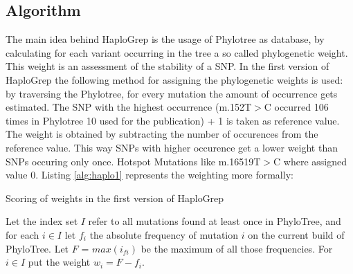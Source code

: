 \subsection{Algorithm}\label{hg:algorithm}
The main idea behind HaploGrep is the usage of Phylotree as database, by calculating for each variant occurring in the tree a so called phylogenetic weight. This weight is an assessment of the stability of a SNP. In the first version of HaploGrep the following method for assigning the phylogenetic weights is used: by traversing the Phylotree, for every mutation the amount of occurrence gets estimated. The SNP with the highest occurrence (m.152T$>$C occurred 106 times in Phylotree 10 used for the publication) + 1 is taken as reference value. The weight is obtained by subtracting the number of occurences from the reference value. This way SNPs with higher occurence get a lower weight than SNPs occuring only once. Hotspot Mutations like m.16519T$>$C where assigned value 0. Listing \ref{alg:haplo1} represents the weighting more formally:

\begin{algorithm}
\caption{Scoring of weights in the first version of HaploGrep}
\label{alg:haplo1}
Let the index set $I$ refer to all mutations found at least once in PhyloTree, and for each $i \in I$ let $f_i$ the absolute frequency of mutation $i$ on the current build of PhyloTree. Let $F$ = $max(i_{fi})$ be the maximum of all those frequencies. For $i \in I$ put the weight $w_i = F-f_i$. 
\end{algorithm}

